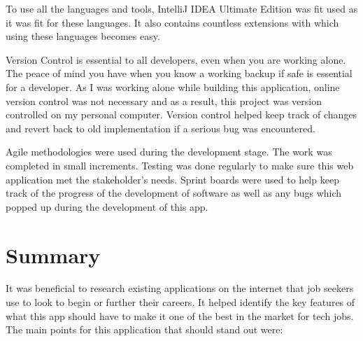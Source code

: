 To use all the languages and tools, IntelliJ IDEA Ultimate Edition \parencite{Reference23} was fit used as it was fit for these languages. It also contains countless extensions with which using these languages becomes easy. 

Version Control is essential to all developers, even when you are working alone. The peace of mind you have when you know a working backup if safe is essential for a developer. As I was working alone while building this application, online version control was not necessary and as a result, this project was version controlled on my personal computer. Version control helped keep track of changes and revert back to old implementation if a serious bug was encountered.

Agile methodologies were used during the development stage. The work was completed in small increments. Testing was done regularly to make sure this web application met the stakeholder's needs. Sprint boards were used to help keep track of the progress of the development of software as well as any bugs which popped up during the development of this app.

\section{Summary}
It was beneficial to research existing applications on the internet that job seekers use to look to begin or further their careers. It helped identify the key features of what this app should have to make it one of the best in the market for tech jobs. The main points for this application that should stand out were:

